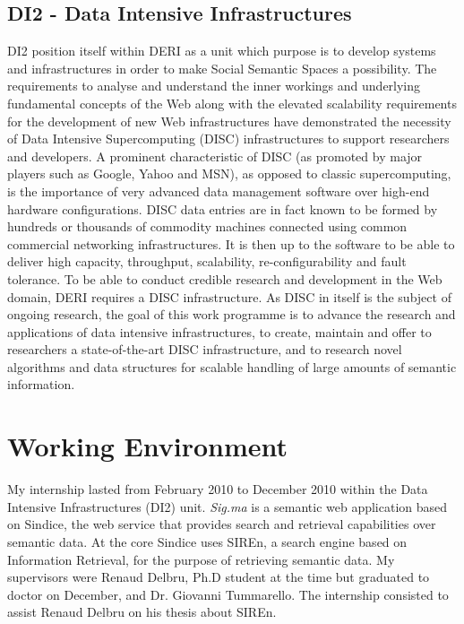 \subsection{DI2 - Data Intensive Infrastructures}

DI2 position itself within DERI as a unit which purpose is to develop systems
and infrastructures in order to make Social Semantic Spaces a possibility.
The requirements to analyse and understand the inner workings and underlying
fundamental concepts of the Web along with the elevated scalability
requirements for the development of new Web infrastructures have demonstrated
the necessity of Data Intensive Supercomputing (DISC) infrastructures to
support researchers and developers. A prominent characteristic of DISC (as
promoted by major players such as Google, Yahoo and MSN), as opposed to
classic supercomputing, is the importance of very advanced data management
software over high-end hardware configurations. DISC data entries are in fact
known to be formed by hundreds or thousands of commodity machines connected
using common commercial networking infrastructures. It is then up to the
software to be able to deliver high capacity, throughput, scalability,
re-configurability and fault tolerance. To be able to conduct credible
research and development in the Web domain, DERI requires a DISC
infrastructure. As DISC in itself is the subject of ongoing research, the goal
of this work programme is to advance the research and applications of data
intensive infrastructures, to create, maintain and offer to researchers a
state-of-the-art DISC infrastructure, and to research novel algorithms and
data structures for scalable handling of large amounts of semantic
information.

\section{Working Environment}

My internship lasted from February 2010 to December 2010 within the Data
Intensive Infrastructures (DI2) unit. \emph{Sig.ma} is a semantic web
application based on Sindice, the web service that provides search and
retrieval capabilities over semantic data. At the core Sindice uses SIREn, a
search engine based on Information Retrieval, for the purpose of retrieving
semantic data. My supervisors were Renaud Delbru, Ph.D student at the time but
graduated to doctor on December, and Dr. Giovanni Tummarello. The internship
consisted  to assist Renaud Delbru on his thesis about SIREn.

